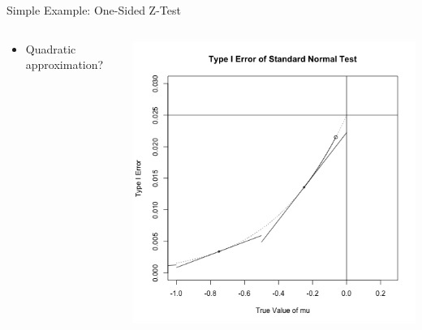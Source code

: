 \begin{frame}{Simple Example: One-Sided Z-Test}
\begin{columns}
\begin{column}{.3\textwidth}
\begin{itemize}
\item Quadratic approximation?
\end{itemize}
\end{column}

\begin{column}{.7\textwidth}
\includegraphics[width=\textwidth]{figures/z-test-7.png}
\end{column}
\end{columns}
\end{frame}

